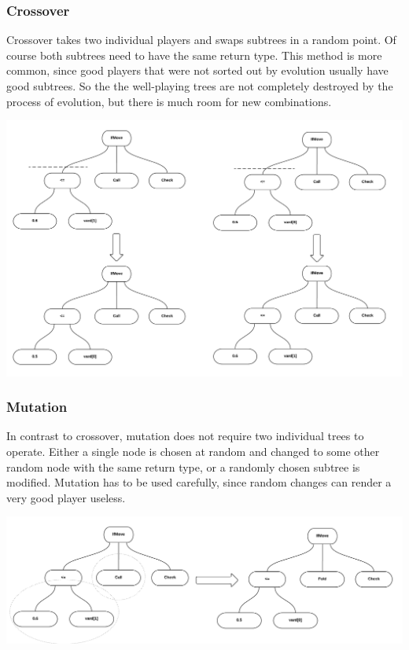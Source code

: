\documentclass[12pt,fleqn,a4paper]{article}
\begin{document}
\subsubsection{Crossover}
Crossover takes two individual players and swaps subtrees in a random point.
Of course both subtrees need to have the same return type.
This method is more common, since good players that were not sorted out by evolution usually have good subtrees.
So the the well-playing trees are not completely destroyed by the process of evolution, but there is much room for new combinations.

\begin{center}
	\includegraphics[width=1.0\textwidth]{tree_crossover.png}
\end{center}

\subsubsection{Mutation}
In contrast to crossover, mutation does not require two individual trees to operate.
Either a single node is chosen at random and changed to some other random node with the same return type,
or a randomly chosen subtree is modified.
Mutation has to be used carefully, since random changes can render a very good player useless.

\begin{center}
	\includegraphics[width=1.0\textwidth]{tree_mutation.png}
\end{center}
\end{document}
